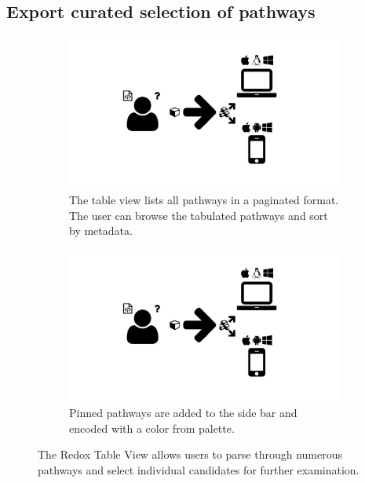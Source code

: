 \subsection{Export curated selection of pathways}

\begin{figure}
  \centering
  \begin{subfigure}[b]{\textwidth}
    \includegraphics[width=\textwidth, page=5,trim=0.37cm 3.65cm 13.1cm 3.3cm, clip=true]{images/Figures.pdf}
    \caption{The table view lists all pathways in a paginated format.
      The user can browse the tabulated pathways and sort by metadata.}
    \label{Figure:redox-table-view}
  \end{subfigure}
  \begin{subfigure}[b]{\textwidth}
    \includegraphics[width=\textwidth, page=5,trim=13.1cm 3.65cm 0.37cm 3.3cm, clip=true]{images/Figures.pdf}
    \caption{Pinned pathways are added to the side bar and encoded with a color from palette.}
    \label{Figure:redox-table-pinned}
  \end{subfigure}
  \caption{The Redox Table View allows users to parse through numerous pathways and select individual candidates for further examination.}
  \label{Figure:redox-table}
\end{figure}

